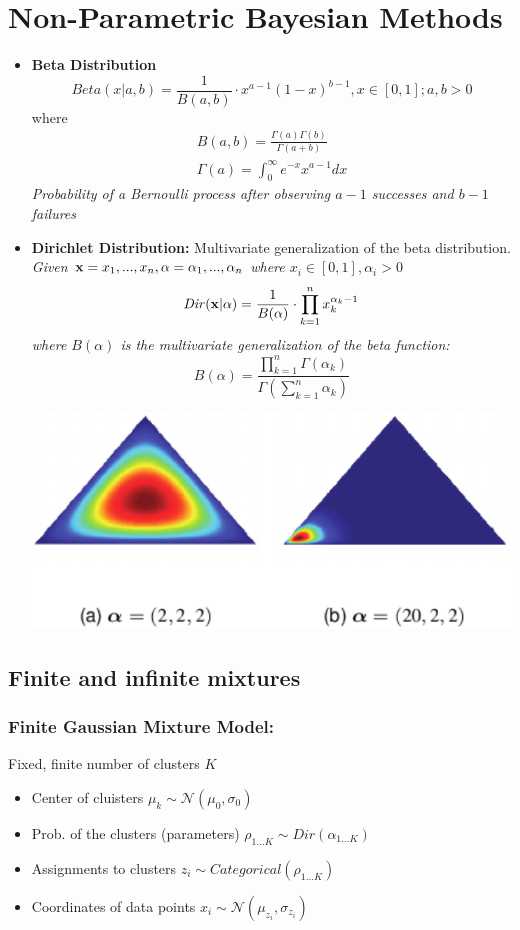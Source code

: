 \section{Non-Parametric Bayesian Methods}
\begin{itemize}
	\item \textbf{Beta Distribution}
	$$
		\mathit{Beta}(x|a,b) = \frac{1}{B(a,b)}\cdot x^{a-1}(1-x)^{b-1}, x\in [0,1]; a,b > 0
	$$
	where 
	\begin{equation*}
		\begin{gathered}
			B(a,b)  =\frac{\Gamma(a)\Gamma(b)}{\Gamma(a + b)}\\
			\Gamma(a) = \int_0^\infty e^{-x}x^{a-1}dx
		\end{gathered}	
	\end{equation*}
	\textit{Probability of a Bernoulli process after observing $a-1$ successes and $b-1$ failures}
	\item \textbf{Dirichlet Distribution:} Multivariate generalization of the beta distribution.\\
	\textit{Given $\mathbf x = x_1, ..., x_n, \alpha = \alpha_1, ..., \alpha_n$ where $x_i\in [0,1], \alpha_i > 0$}
	$$
		\mathit{Dir}(\mathbf x|\alpha) = \frac{1}{B(\alpha)}\cdot \prod_{k=1}^n x_k^{\alpha_k-1}
	$$
	\textit{where $B(\alpha)$ is the multivariate generalization of the beta function: }
	$$
		B(\alpha) = \frac{\prod_{k=1}^n \Gamma(\alpha_k)}{\Gamma(\sum_{k = 1}^n \alpha_k)}
	$$
	\begin{center}
		\includegraphics[width=0.8\columnwidth]{images/12b-dirichlet}
	\end{center}
	
\end{itemize}
\subsection{Finite and infinite mixtures}
\subsubsection{Finite Gaussian Mixture Model: } Fixed, finite number of clusters $K$
	\begin{itemize}
		\item Center of cluisters $\mu_k\sim \mathcal N(\mu_0, \sigma_0)$
		\item Prob. of the clusters (parameters) $\rho_{1...K}\sim \mathit{Dir}(\alpha_{1...K})$
		\item Assignments to clusters $z_i\sim \mathit{Categorical}(\rho_{1...K})$
		\item Coordinates of data points $x_i \sim \mathcal N(\mu_{z_i}, \sigma_{z_i})$
	\end{itemize} 
